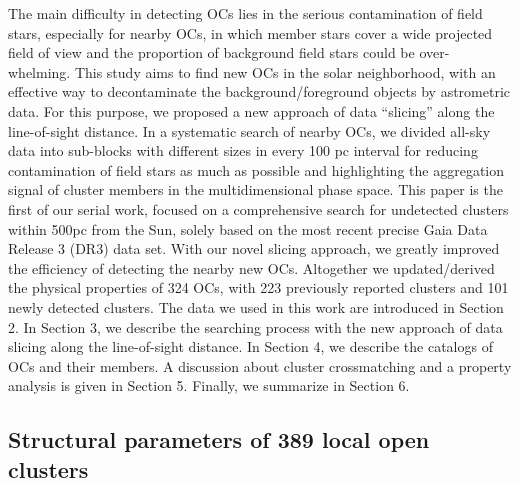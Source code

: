 \documentclass[../main.tex]{subfiles}
\begin{document}
The main difficulty in detecting OCs lies in the serious contamination of field stars, especially for nearby OCs, in which member stars cover a wide projected field of view and the proportion of background field stars could be over- whelming. This study aims to find new OCs in the solar neighborhood, with an effective way to decontaminate the background/foreground objects by astrometric data. For this purpose, we proposed a new approach of data “slicing” along the line-of-sight distance. In a systematic search of nearby OCs, we divided all-sky data into sub-blocks with different sizes in every 100 pc interval for reducing contamination of field stars as much as possible and highlighting the aggregation signal of cluster members in the multidimensional phase space.
This paper is the first of our serial work, focused on a comprehensive search for undetected clusters within 500pc from the Sun, solely based on the most recent precise Gaia Data Release 3 (DR3) data set. With our novel slicing approach, we greatly improved the efficiency of detecting the nearby new OCs. Altogether we updated/derived the physical properties of 324 OCs, with 223 previously reported clusters and 101 newly detected clusters. The data we used in this work are introduced in Section 2. In Section 3, we describe the searching process with the new approach of data slicing along the line-of-sight distance. In Section 4, we describe the catalogs of OCs and their members. A discussion about cluster crossmatching and a property analysis is given in Section 5. Finally, we summarize in Section 6.
\subsection{Structural parameters of 389 local open clusters} %
\end{document}
